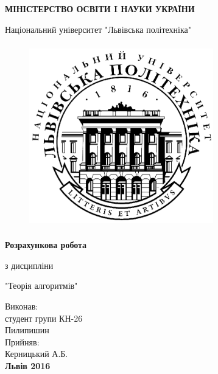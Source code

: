 \documentclass[a4paper,12pt]{article}
\begin{document}
 
\begin{titlepage}
	\begin{center}
	\large
	\textbf {МІНІСТЕРСТВО ОСВІТИ I НАУКИ УКРАЇНИ}
	
	\large
	Національний університет "Львівська політехніка"

	\begin{figure}[h]
		\includegraphics[width=8cm, height=8cm]{lpLogo}
		\centering		
	\end{figure}

	\Large
	\textbf{Розрахункова робота}

	\large	
	з дисципліни

	\large	
	"Теорія алгоритмів"

	\vfill
	\raggedleft
	\normalsize
	Виконав:\\
	студент групи КН-26\\
	Пилипишин\\
	Прийняв:\\
	Керницький А.Б.\\
	
	\vspace{30mm}
	\centering
	\small
	\textbf{Львів 2016}
	\end{center}
\end{titlepage}
 

 
\end{document}
